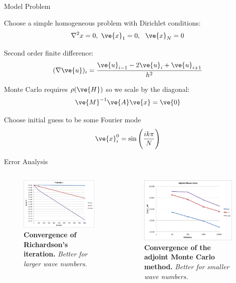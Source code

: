 \documentclass{beamer}
\begin{document}
\begin{frame}{Model Problem}

  Choose a simple homogeneous problem with Dirichlet conditions:
  \[
  \nabla^2 x = 0, \ \ve{x}_1 = 0,\ \ \ve{x}_N = 0
  \]

  Second order finite difference:
  \[
  (\nabla \ve{u})_i = \frac{\ve{u}_{i-1} - 2 \ve{u}_{i} + \ve{u}_{i+1}}{h^2}
  \]

  Monte Carlo requires $\rho(\ve{H})$ so we scale by the diagonal:
  \[
  \ve{M}^{-1}\ve{A}\ve{x} = \ve{0}
  \]

  Choose initial guess to be some Fourier mode
  \[
  \ve{x}^0_i = \sin\Bigg( \frac{ik\pi}{N} \Bigg)
  \]

\end{frame}

\begin{frame}{Error Analysis}

  \begin{columns}

    \begin{column}{0.5\textwidth}
      \begin{figure}[h!]
        \begin{center}
          \includegraphics[width=2in]{richardson.png}
        \end{center}
        \caption{\textbf{Convergence of Richardson's iteration.}
          \textit{Better for larger wave numbers.}}
        \label{fig:richardson}
      \end{figure}
    \end{column}

    \begin{column}{0.5\textwidth}
      \begin{figure}[h!]
        \begin{center}
          \includegraphics[width=2in]{adjoint_mc.png}
        \end{center}
        \caption{\textbf{Convergence of the adjoint Monte Carlo
            method.} \textit{Better for smaller wave numbers.} }
        \label{fig:adjoint_mc}
      \end{figure}
    \end{column}

  \end{columns}

\end{frame}
\end{document}
